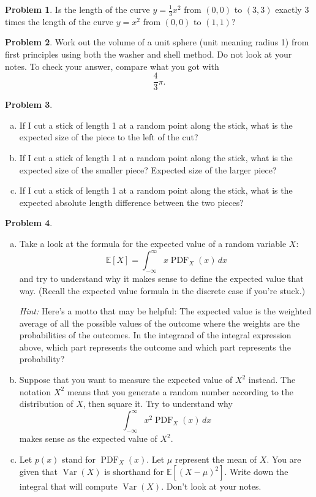 \documentclass[11pt,oneside]{amsart}
\theoremstyle{definition}
\newtheorem{problem}{Problem}
\newcommand{\bE}{\mathbb{E}}
\DeclareMathOperator{\Var}{Var}
\DeclareMathOperator{\PDF}{PDF}
\begin{document}
\begin{problem}
Is the length of the curve $y=\frac 13x^2$ from $(0,0)$ to $(3,3)$ exactly 3 times the length of the curve $y=x^2$ from $(0,0)$ to $(1,1)$?
\end{problem}

\begin{problem}
Work out the volume of a unit sphere (unit meaning radius 1) from first principles using both the washer and shell method. Do not look at your notes. To check your answer, compare what you got with
\[\frac 43\pi.\]
\end{problem}

\begin{problem}
\leavevmode \begin{enumerate}[(a)]
  \item If I cut a stick of length 1 at a random point along the stick, what is the expected size of the piece to the left of the cut?
  \item If I cut a stick of length 1 at a random point along the stick, what is the expected size of the smaller piece? Expected size of the larger piece?
  \item If I cut a stick of length 1 at a random point along the stick, what is the expected absolute length difference between the two pieces?
\end{enumerate}
\end{problem}

\begin{problem}
\leavevmode\begin{enumerate}[(a)]
  \item Take a look at the formula for the expected value of a random variable $X$:
        \[\bE[X]=\int_{-\infty}^\infty x\PDF_X(x)\,dx\]
        and try to understand why it makes sense to define the expected value that way. (Recall the expected value formula in the discrete case if you're stuck.)

        \emph{Hint:} Here's a motto that may be helpful: The expected value is the weighted average of all the possible values of the outcome where the weights are the probabilities of the outcomes. In the integrand of the integral expression above, which part represents the outcome and which part represents the probability?
  \item Suppose that you want to measure the expected value of $X^2$ instead. The notation $X^2$ means that you generate a random number according to the distribution of $X$, then square it. Try to understand why
        \[\int_{-\infty}^\infty x^2\PDF_X(x)\,dx\]
        makes sense as the expected value of $X^2$.
  \item Let $p(x)$ stand for $\PDF_X(x)$. Let $\mu$ represent the mean of $X$. You are given that $\Var(X)$ is shorthand for $\bE[(X-\mu)^2]$. Write down the integral that will compute $\Var(X)$. Don't look at your notes.
\end{enumerate}
\end{problem}
\end{document}
